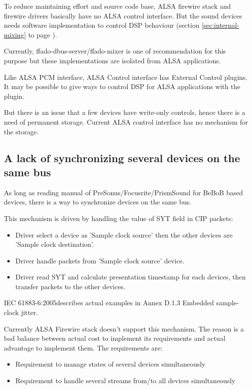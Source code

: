 \documentclass[onecolumn]{article}
\begin{document}
To reduce maintaining effort and source code base, ALSA firewire stack and firewire drivers basically have no ALSA control interface. But the sound devices needs software implementation to control DSP behaviour (section \ref{sec:internal-mixing} to page \pageref{sec:internal-mixing}).

Currently, ffado-dbus-server/ffado-mixer is one of recommendation for this purpose but these implementations are isolated from ALSA applications.

Like ALSA PCM interface, ALSA Control interface has External Control plugins. It may be possible to give ways to control DSP for ALSA applications with the plugin.

But there is an issue that a few devices have write-only controls, hence there is a need of permanent storage. Current ALSA control interface has no mechanism for the storage.


\subsection{A lack of synchronizing several devices on the same bus}
As long as reading manual of PreSonus/Focusrite/PrismSound for BeBoB based devices, there is a way to synchronize devices on the same bus.

This mechanism is driven by handling the value of SYT field in CIP packets:
\begin{itemize}
\item Driver select a device as 'Sample clock source' then the other devices are 'Sample clock destination'.
\item Driver handle packets from 'Sample clock source' device.
\item Driver read SYT and calculate presentation timestamp for each devices, then transfer packets to the other devices.
\end{itemize}

IEC 61883-6:2005\cite{iec61883-6-2}describes actual examples in Annex D.1.3 Embedded sample-clock jitter.

Currently ALSA Firewire stack doesn't support this mechanism. The reason is a bad balance between actual cost to implement its requirements and actual advantage to implement them. The requirements are:
\begin{itemize}
\item Requirement to manage states of several devices simultaneously
\item Requirement to handle several streams from/to all devices simultaneously
\end{itemize}
\end{document}
